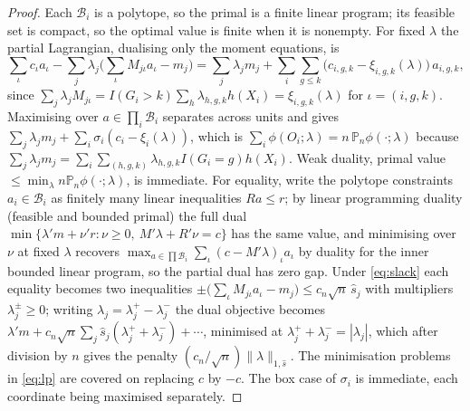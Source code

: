\documentclass[12pt]{article}
\theoremstyle{remark}
\begin{document}
\begin{proof}
Each $\mathcal{B}_i$ is a polytope, so the primal is a finite linear program; its feasible
set is compact, so the optimal value is finite when it is nonempty. For fixed $\lambda$ the
partial Lagrangian, dualising only the moment equations, is
\[
\sum_\iota c_\iota a_\iota - \sum_j \lambda_j\Big(\sum_\iota M_{j\iota}a_\iota - m_j\Big)
= \sum_j \lambda_j m_j + \sum_i \sum_{g \le k}\big(c_{i,g,k} - \xi_{i,g,k}(\lambda)\big)\,a_{i,g,k},
\]
since $\sum_j \lambda_j M_{j\iota} = I(G_i{>}k)\sum_h \lambda_{h,g,k}h(X_i) = \xi_{i,g,k}(\lambda)$
for $\iota = (i,g,k)$. Maximising over $a \in \prod_i \mathcal{B}_i$ separates across
units and gives $\sum_j \lambda_j m_j + \sum_i \sigma_i(c_i - \xi_i(\lambda))$, which is
$\sum_i \phi(O_i;\lambda) = n\,\mathbb{P}_n\phi(\cdot;\lambda)$ because
$\sum_j \lambda_j m_j = \sum_i \sum_{(h,g,k)} \lambda_{h,g,k} I(G_i{=}g)h(X_i)$. Weak
duality, primal value $\le \min_\lambda n\mathbb{P}_n\phi(\cdot;\lambda)$, is immediate.
For equality, write the polytope constraints $a_i \in \mathcal{B}_i$ as finitely many
linear inequalities $R a \le r$; by linear programming duality (feasible and bounded primal)
the full dual $\min\{\lambda' m + \nu' r : \nu \ge 0,\ M'\lambda + R'\nu = c\}$ has the
same value, and minimising over $\nu$ at fixed $\lambda$ recovers
$\max_{a \in \prod \mathcal{B}_i}\sum_\iota (c - M'\lambda)_\iota a_\iota$ by duality for
the inner bounded linear program, so the partial dual has zero gap. Under \eqref{eq:slack}
each equality becomes two inequalities
$\pm\big(\sum_\iota M_{j\iota}a_\iota - m_j\big) \le c_n\sqrt{n}\,\widehat s_j$ with
multipliers $\lambda_j^{\pm} \ge 0$; writing $\lambda_j = \lambda_j^{+} - \lambda_j^{-}$
the dual objective becomes
$\lambda' m + c_n\sqrt{n}\sum_j \widehat s_j(\lambda_j^{+} + \lambda_j^{-}) + \cdots$,
minimised at $\lambda_j^{+} + \lambda_j^{-} = |\lambda_j|$, which after division by $n$
gives the penalty $(c_n/\sqrt{n})\|\lambda\|_{1,\widehat s}$. The minimisation problems in \eqref{eq:lp}
are covered on replacing $c$ by $-c$. The box case of $\sigma_i$ is immediate, each
coordinate being maximised separately.
\end{proof}
\end{document}
